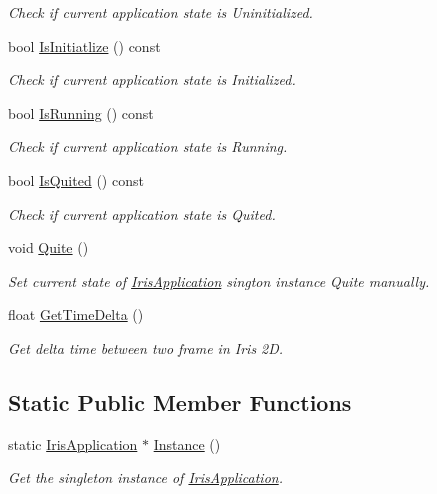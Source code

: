 \begin{DoxyCompactItemize}
\begin{DoxyCompactList}\small\item\em Check if current application state is Uninitialized. \end{DoxyCompactList}\item 
bool \hyperlink{class_iris2_d_1_1_iris_application_ab7a5b7f956f23d3fb3d2ee0de573cb53}{Is\+Initiatlize} () const
\begin{DoxyCompactList}\small\item\em Check if current application state is Initialized. \end{DoxyCompactList}\item 
bool \hyperlink{class_iris2_d_1_1_iris_application_a795cea1f5d8112a7db7d6429f306a5ff}{Is\+Running} () const
\begin{DoxyCompactList}\small\item\em Check if current application state is Running. \end{DoxyCompactList}\item 
bool \hyperlink{class_iris2_d_1_1_iris_application_ae9760ff496a4c80f96ad49331407c2e4}{Is\+Quited} () const
\begin{DoxyCompactList}\small\item\em Check if current application state is Quited. \end{DoxyCompactList}\item 
void \hyperlink{class_iris2_d_1_1_iris_application_adca8cada1a8841c3f409e856f6878331}{Quite} ()
\begin{DoxyCompactList}\small\item\em Set current state of \hyperlink{class_iris2_d_1_1_iris_application}{Iris\+Application} sington instance Quite manually. \end{DoxyCompactList}\item 
float \hyperlink{class_iris2_d_1_1_iris_application_a3b8f4de1902aeda08acbe243aad34f15}{Get\+Time\+Delta} ()
\begin{DoxyCompactList}\small\item\em Get delta time between two frame in Iris 2D. \end{DoxyCompactList}\end{DoxyCompactItemize}
\subsection*{Static Public Member Functions}
\begin{DoxyCompactItemize}
\item 
\mbox{\label{class_iris2_d_1_1_iris_application_ab2a9826c10d90732f398859782817f8e}} 
static \hyperlink{class_iris2_d_1_1_iris_application}{Iris\+Application} $\ast$ \hyperlink{class_iris2_d_1_1_iris_application_ab2a9826c10d90732f398859782817f8e}{Instance} ()
\begin{DoxyCompactList}\small\item\em Get the singleton instance of \hyperlink{class_iris2_d_1_1_iris_application}{Iris\+Application}. \end{DoxyCompactList}\end{DoxyCompactItemize}


